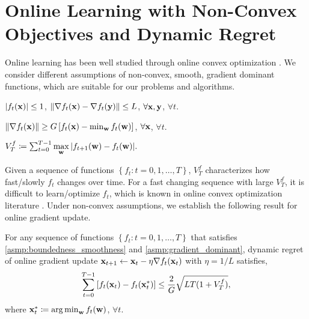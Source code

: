\section{Online Learning with Non-Convex Objectives and Dynamic Regret}
\label{sec:online_learning}

Online learning has been well studied through online convex optimization \citep{shalev2012online}. We consider different assumptions of non-convex, smooth, gradient dominant functions, which are suitable for our problems and algorithms.

\begin{asmp}
\label{asmp:boundedness_smoothness}
$\left| f_t({\mathbf{x}}) \right| \le 1$, $\left\| \nabla f_t({\mathbf{x}} ) - \nabla f_t({\mathbf{y}}) \right\| \le L $, $\forall {\mathbf{x}}, {\mathbf{y}}$, $\forall t$.
\end{asmp}

\begin{asmp}
\label{asmp:gradient_dominant}
$\left\| \nabla f_t({\mathbf{x}}) \right\| \ge G \left[ f_t({\mathbf{x}}) - \min_{{\mathbf{w}}}{ f_t({\mathbf{w}} )} \right]$, $\forall {\mathbf{x}}$, $\forall t$.
\end{asmp}

\begin{defi}
\label{defi:function_variation}
$V_{T}^{f} \coloneqq \sum_{t=0}^{T-1}{\max\limits_{{\mathbf{w}}}{\left| f_{t+1}({\mathbf{w}}) - f_{t}({\mathbf{w}}) \right| } }.$
\end{defi}

Given a sequence of functions $\left\{ f_t : t = 0, 1, \dots, T \right\}$, $V_{T}^{f} $ characterizes how fast/slowly $f_t$ changes over time. For a fast changing sequence with large $V_{T}^{f} $, it is difficult to learn/optimize $f_t$, which is known in online convex optimization literature \citep{jadbabaie2015online}. Under non-convex assumptions, we establish the following result for online gradient update.

\begin{thm}
\label{thm:online_learning_regret}
For any sequence of functions $\left\{ f_t : t = 0, 1, \dots, T \right\}$ that satisfies \cref{asmp:boundedness_smoothness} and \cref{asmp:gradient_dominant}, dynamic regret of online gradient update ${\mathbf{x}}_{t+1} \gets {\mathbf{x}}_{t} - \eta \nabla f_{t}({\mathbf{x}}_{t})$ with $\eta = 1/L$ satisfies,
\begin{equation}
\label{eq:online_learning_regret}
\begin{split}
    \sum\limits_{t=0}^{T-1}{\left[ f_t({\mathbf{x}}_t) - f_t( {\mathbf{x}}_t^*) \right]} \le \frac{2}{G} \sqrt{L T ( 1 + V_T^f )},
\end{split}
\end{equation}
where ${\mathbf{x}}_t^* \coloneqq \operatorname*{arg\,min}_{{\mathbf{w}}}{f_t({\mathbf{w}})}$, $\forall t$.
\end{thm}

